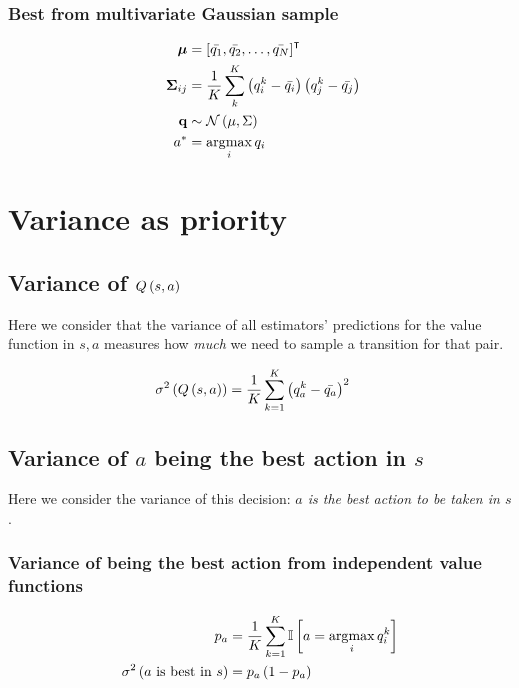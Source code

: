 \documentclass[10pt]{article}
\begin{document}
\subsubsection{Best from multivariate Gaussian sample}
\begin{align*}
	\tensor{\mu}         & = \trans{\left[ \bar{q_1}, \bar{q_2}, \ldots, \bar{q_N} \right]}                      \\
	\tensor{\Sigma}_{ij} & = \frac{1}{K}\sum_{k}^{K}\left(q^k_i -\bar{q_i}\right) \left( q^k_j -\bar{q_j}\right) \\
	\mathbf{q}           & \sim \func[\mathcal{N}]{\mu, \Sigma}                                                  \\ \quad a^* &= \argmax{i} q_i
\end{align*}


\section{Variance as priority}

\subsection{Variance of $\func[Q]{s,a}$}

Here we consider that the variance of all estimators' predictions for the value
function in $s, a$ measures how \emph{much} we need to sample a transition for
that pair.

\begin{align}
	\func[\sigma^2]{\func[Q]{s,a}} & =
	\frac{1}{K}\sum_{k=1}^{K} \left(q^k_a - \bar{q_a}\right)^2
\end{align}

\subsection{Variance of $a$ being the best action in $s$}

Here we consider the variance of this decision:
\emph{$a$ is the best action to be taken in $s$}.

\subsubsection{Variance of being the best action from independent value functions}

\begin{align}
	p_a                                     & = \frac{1}{K}\sum_{k=1}^{K}
	\iverson{a = \argmax{i} q^k_i }                                       \\
	\func[\sigma^2]{a\text{ is best in } s} & = p_a \left(1 - p_a\right)
\end{align}
\end{document}
